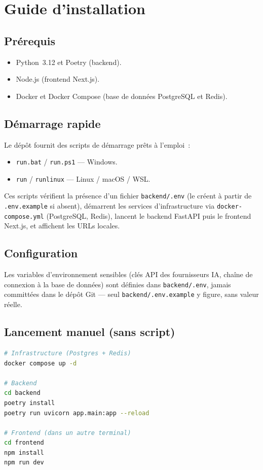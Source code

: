 \chapter{Guide d'installation}

\section{Prérequis}
\begin{itemize}
    \item Python~3.12 et Poetry (backend).
    \item Node.js (frontend Next.js).
    \item Docker et Docker Compose (base de données PostgreSQL et Redis).
\end{itemize}

\section{Démarrage rapide}
Le dépôt fournit des scripts de démarrage prêts à l'emploi~:
\begin{itemize}
    \item \texttt{run.bat} / \texttt{run.ps1} — Windows.
    \item \texttt{run} / \texttt{runlinux} — Linux / macOS / WSL.
\end{itemize}

Ces scripts vérifient la présence d'un fichier \texttt{backend/.env} (le créent à partir
de \texttt{.env.example} si absent), démarrent les services d'infrastructure via
\texttt{docker-compose.yml} (PostgreSQL, Redis), lancent le backend FastAPI puis le
frontend Next.js, et affichent les URLs locales.

\section{Configuration}
Les variables d'environnement sensibles (clés API des fournisseurs IA, chaîne de
connexion à la base de données) sont définies dans \texttt{backend/.env}, jamais
committées dans le dépôt Git — seul \texttt{backend/.env.example} y figure, sans valeur
réelle.

\section{Lancement manuel (sans script)}
\begin{lstlisting}[language=bash]
# Infrastructure (Postgres + Redis)
docker compose up -d

# Backend
cd backend
poetry install
poetry run uvicorn app.main:app --reload

# Frontend (dans un autre terminal)
cd frontend
npm install
npm run dev
\end{lstlisting}

